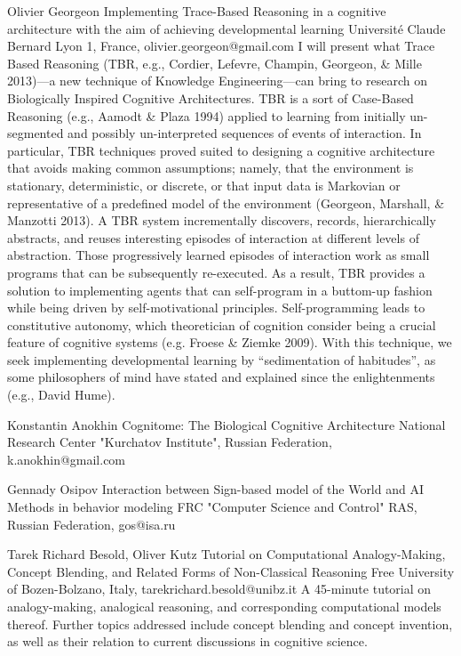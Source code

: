 \documentclass[10pt,fleqn,openany]{book} %
\begin{document}
\begin{enumerate}
	\paperabstract
		{Olivier Georgeon}
		{Implementing Trace-Based Reasoning in a cognitive architecture with the aim of achieving developmental learning}
		{Université Claude Bernard Lyon 1, France, olivier.georgeon@gmail.com}		
		{
			I will present what Trace Based Reasoning (TBR, e.g., Cordier, Lefevre, Champin, Georgeon, \& Mille 2013)—a new technique of Knowledge Engineering—can bring to research on Biologically Inspired Cognitive Architectures. TBR is a sort of Case-Based Reasoning (e.g., Aamodt \& Plaza 1994) applied to learning from initially un-segmented and possibly un-interpreted sequences of events of interaction. In particular, TBR techniques proved suited to designing a cognitive architecture that avoids making common assumptions; namely, that the environment is stationary, deterministic, or discrete, or that input data is Markovian or representative of a predefined model of the environment (Georgeon, Marshall, \& Manzotti 2013). A TBR system incrementally discovers, records, hierarchically abstracts, and reuses interesting episodes of interaction at different levels of abstraction. Those progressively learned episodes of interaction work as small programs that can be subsequently re-executed. As a result, TBR provides a solution to implementing agents that can self-program in a buttom-up fashion while being driven by self-motivational principles. Self-programming leads to constitutive autonomy, which theoretician of cognition consider being a crucial feature of cognitive systems (e.g. Froese \& Ziemke 2009). With this technique, we seek implementing developmental learning by “sedimentation of habitudes”, as some philosophers of mind have stated and explained since the enlightenments (e.g., David Hume).}
		
	\paperabstract
		{Konstantin Anokhin}
		{Cognitome: The Biological Cognitive Architecture}
		{National Research Center "Kurchatov Institute", Russian Federation,\\k.anokhin@gmail.com}
		{}
		
	\paperabstract
		{Gennady Osipov}
		{Interaction between Sign-based model of the World and AI Methods in behavior modeling}
		{FRC "Computer Science and Control" RAS, Russian Federation, gos@isa.ru}
		{}
		
	\paperabstract
		{Tarek Richard Besold, Oliver Kutz}
		{Tutorial on Computational Analogy-Making, Concept Blending, and Related Forms of Non-Classical Reasoning}
		{Free University of Bozen-Bolzano, Italy, tarekrichard.besold@unibz.it}
		{
			A 45-minute tutorial on analogy-making, analogical reasoning, and corresponding computational models thereof. Further topics addressed include concept blending and concept invention, as well as their relation to current discussions in cognitive science.}
		

\end{enumerate}
\end{document}
